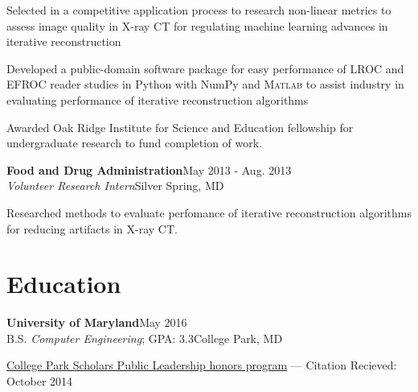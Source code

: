 \documentclass[letterpaper,11pt]{article}
\def \jobskip{.5em}
\newcommand{\resentry}[6]{
\large{\sffamily\textbf{#1}}\hfill{\rmfamily\normalsize\textcolor{faded}{#2}} \\
\normalsize{#3}\hfill{\textcolor{faded}{\normalsize#4}}\\
\normalsize{#5}
\footnotesize{#6}
}
\begin{document}
   { 
      \begin{resumeitemize}
	 \item{Selected in a competitive application process to research non-linear metrics to assess image quality in {X-ray CT} for regulating machine learning advances in iterative reconstruction}
            \item{Developed a public-domain software package for easy performance of LROC and EFROC reader studies in Python with NumPy and \textsc{Matlab} to assist industry in evaluating performance of iterative reconstruction algorithms}
	 \item{Awarded Oak Ridge Institute for Science and Education fellowship for undergraduate research to fund completion of work.}
          \end{resumeitemize}
   }
\vspace{\jobskip}
\resentry{{Food and Drug Administration}}{May 2013 \-- Aug. 2013}{\emph{Volunteer Research Intern}}{Silver Spring, MD}{\vspace{-1em}}
   { 
\begin{resumeitemize}
\item{Researched methods to evaluate perfomance of iterative reconstruction algorithms for reducing artifacts in {X-ray CT}.}
\end{resumeitemize}
   }
\section*{Education}
\resentry{{University of Maryland}}{May 2016}{B.S. \emph{Computer Engineering}; GPA: 3.3}{College Park, MD}{\vspace{-1em}}{\footnotesize
 \begin{resumeitemize}
            \item{\href{http://www.scholars.umd.edu/programs/pl}{College Park Scholars Public Leadership honors program} --- Citation Recieved: October 2014}
          \end{resumeitemize}
}
\end{document}
